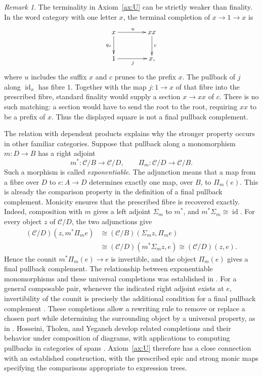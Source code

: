 \documentclass[11pt,a4paper]{article}
\theoremstyle{plain}
\theoremstyle{definition}
\theoremstyle{remark}
\newtheorem{remark}[theorem]{Remark}
\newcommand{\C}{\mathcal C}
\newcommand{\id}{\operatorname{id}}
\begin{document}
\begin{remark}\label{concl:rem:constant-not-final}
The terminality in Axiom~\ref{ax:U} can be strictly weaker
than finality. In the word category with one letter $x$, the
terminal completion of $x\to1\to x$ is
\[
\xymatrix@C=4em@R=2.5em{
x\ar[r]^u\ar[d]_{q_x}&xx\ar[d]^c\\
1\ar[r]_j&x,
}
\]
where $u$ includes the suffix $x$ and $c$ prunes to the
prefix $x$. The pullback of $j$ along $\id_x$ has fibre $1$.
Together with the map $j:1\to x$ of that fibre into the
prescribed fibre, standard finality would supply a section
$x\to xx$ of $c$. There is no such matching: a section would
have to send the root to the root, requiring $xx$ to be a
prefix of $x$. Thus the displayed square is not a final
pullback complement.
\end{remark}

The relation with dependent products explains why the stronger
property occurs in other familiar categories. Suppose that
pullback along a monomorphism $m:D\to B$ has a right adjoint
\[
m^*:\C/B\longrightarrow\C/D,
\qquad \Pi_m:\C/D\longrightarrow\C/B.
\]
Such a morphism is called \emph{exponentiable}. The adjunction
means that a map from a fibre over $D$ to $e:A\to D$ determines
exactly one map, over $B$, to $\Pi_m(e)$. This is already the
comparison property in the definition of a final pullback
complement. Monicity ensures that the prescribed fibre is
recovered exactly. Indeed, composition with $m$ gives a left
adjoint $\Sigma_m$ to $m^*$, and $m^*\Sigma_m\cong\id$.
For every object $z$ of $\C/D$, the two adjunctions give
\[
\begin{aligned}
(\C/D)(z,m^*\Pi_m e)
&\cong(\C/B)(\Sigma_m z,\Pi_m e)\\
&\cong(\C/D)(m^*\Sigma_m z,e)
\cong(\C/D)(z,e).
\end{aligned}
\]
Hence the counit $m^*\Pi_m(e)\to e$ is invertible, and the
object $\Pi_m(e)$ gives a final pullback complement. The
relationship between exponentiable monomorphisms and these
universal completions was established in
\cite{DyckhoffTholen}. For a general composable pair, whenever
the indicated right adjoint exists at $e$, invertibility of
the counit is precisely the additional condition for a final
pullback complement \cite[Lemma~11]{CorradiniEtAl}.
These completions allow a rewriting rule to remove or replace
a chosen part while determining the surrounding object by a
universal property, as in \cite{CorradiniEtAl}.
Hosseini, Tholen, and Yeganeh develop related completions and
their behavior under composition of diagrams, with applications
to computing pullbacks in categories of spans
\cite{HosseiniTholenYeganeh}. Axiom~\ref{ax:U} therefore has
a close connection with an established construction, with
the prescribed epic and strong monic maps specifying the
comparisons appropriate to expression trees.
\end{document}
